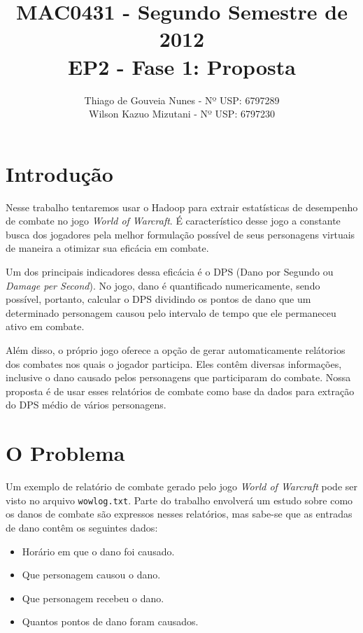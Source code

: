 \documentclass[a4paper,11pt]{article}
\title{MAC0431 - Segundo Semestre de 2012 \\
       EP2 - Fase 1: Proposta}
\author{Thiago de Gouveia Nunes - Nº USP: 6797289 \\
        Wilson Kazuo Mizutani - Nº USP: 6797230}
\begin{document}
\maketitle

\section{Introdução}

  Nesse trabalho tentaremos usar o Hadoop para extrair estatísticas de
  desempenho de combate no jogo \textit{World of Warcraft}. É característico
  desse jogo a constante busca dos jogadores pela melhor formulação possível de
  seus personagens virtuais de maneira a otimizar sua eficácia em combate.
  
  Um dos principais indicadores dessa eficácia é o DPS (Dano por Segundo ou
  \textit{Damage per Second}). No jogo, dano é quantificado numericamente, sendo
  possível, portanto, calcular o DPS dividindo os pontos de dano que um
  determinado personagem causou pelo intervalo de tempo que ele permaneceu ativo
  em combate.
  
  Além disso, o próprio jogo oferece a opção de gerar automaticamente relátorios
  dos combates nos quais o jogador participa. Eles contêm diversas informações,
  inclusive o dano causado pelos personagens que participaram do combate.
  Nossa proposta é de usar esses relatórios de combate como base da dados para
  extração do DPS médio de vários personagens.

\section{O Problema}

  Um exemplo de relatório de combate gerado pelo jogo \textit{World of Warcraft}
  pode ser visto no arquivo \verb$wowlog.txt$. Parte do trabalho
  envolverá um estudo sobre como os danos de combate são expressos nesses
  relatórios, mas sabe-se que as entradas de dano contêm os seguintes dados:
  
  \begin{itemize}
  
    \item Horário em que o dano foi causado.
    \item Que personagem causou o dano.
    \item Que personagem recebeu o dano.
    \item Quantos pontos de dano foram causados.
  
  \end{itemize}
  
\end{document}
